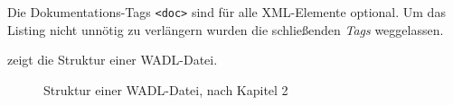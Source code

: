 Die Dokumentations-Tags \texttt{<doc>} sind für alle XML-Elemente optional.
Um das Listing nicht unnötig zu verlängern wurden die schließenden \emph{Tags} weggelassen.

 zeigt die Struktur einer WADL-Datei.

\newpage
\begin{figure}[!htb]
    \centering
    \resizebox{\textwidth}{!}{
        
    }
    \caption{Struktur einer WADL-Datei, nach Kapitel 2 \cite{hadleyWADL}}
    \label{fig:wadlstructure}
\end{figure}